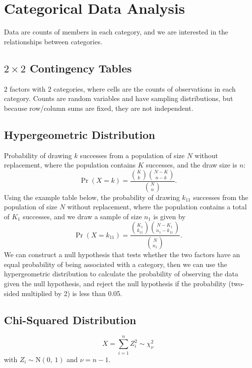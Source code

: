 \documentclass{article}
\begin{document}
\section{Categorical Data Analysis}
Data are counts of members in each category, and we are interested in the relationships between categories.
\begin{multicols}{3}
    \begingroup
    \allowdisplaybreaks
    \raggedbottom
    \subsection{\texorpdfstring{\(2 \times 2\)}{2x2} Contingency Tables}
    2 factors with 2 categories, where cells are the counts of observations in each category.
    Counts are random variables and have sampling distributions, but because row/column sums are fixed, they are not
    independent.
    \subsection{Hypergeometric Distribution}
    Probability of drawing \(k\) successes from a population of size \(N\) without replacement,
    where the population contains \(K\) successes, and the draw size is \(n\):
    \begin{equation*}
        \Pr{\left( X = k \right)} = \frac{\binom{K}{k} \binom{N - K}{n - k}}{\binom{N}{n}}.
    \end{equation*}
    Using the example table below,
    the probability of drawing \(k_{11}\) successes from the population of size \(N\) without replacement, where the population contains a total of
    \(K_1\) successes, and we draw a sample of size \(n_1\) is given by
    \begin{equation*}
        \Pr{\left( X = k_{11} \right)} = \frac{\binom{K_1}{k_{11}} \binom{N - K_1}{n_1 - k_{11}}}{\binom{N}{n_1}}.
    \end{equation*}
    We can construct a null hypothesis that tests whether the two factors have an equal probability of being
    associated with a category, then we can use the hypergeometric distribution to calculate the probability of
    observing the data given the null hypothesis, and reject the null hypothesis if the probability (two-sided multiplied by 2)
    is less than 0.05.
    \subsection{Chi-Squared Distribution}
    \begin{equation*}
        X = \sum_{i = 1}^n Z_i^2 \sim \chi_\nu^2
    \end{equation*}
    with \(Z_i \sim \mathrm{N}\left( 0,\: 1 \right)\) and \(\nu = n - 1\).

\end{multicols}
\end{document}
